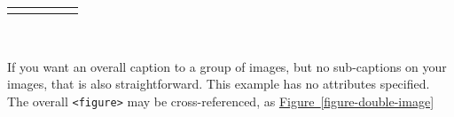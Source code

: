 \documentclass[10pt,]{article}
\theoremstyle{plain}
\theoremstyle{definition}
\theoremstyle{definition}
\theoremstyle{definition}
\theoremstyle{definition}
\theoremstyle{definition}
\theoremstyle{definition}
\numberwithin{equation}{section}
\newlength{\panelmax}
\begin{document}
{\setlength{\phEimage}{\ht\panelboxEimage+\dp\panelboxEimage}
\settototalheight{\phEimage}{\usebox{\panelboxEimage}}
\setlength{\panelmax}{\maxof{\panelmax}{\phEimage}}
\leavevmode%
\setlength{\tabcolsep}{0\linewidth}
\par\medskip\noindent
\begin{tabular}{@{}*{5}{c}@{}}
\begin{minipage}[c][\panelmax][t]{0.1\linewidth}\usebox{\panelboxAimage}\end{minipage}&
\begin{minipage}[c][\panelmax][c]{0.3\linewidth}\usebox{\panelboxBimage}\end{minipage}&
\begin{minipage}[c][\panelmax][b]{0.2\linewidth}\usebox{\panelboxCimage}\end{minipage}&
\begin{minipage}[c][\panelmax][t]{0.2\linewidth}\usebox{\panelboxDimage}\end{minipage}&
\begin{minipage}[c][\panelmax][c]{0.2\linewidth}\usebox{\panelboxEimage}\end{minipage}\end{tabular}\\
}%
\par
\hypertarget{p-656}{}%
If you want an overall caption to a group of images, but no sub-captions on your images, that is also straightforward.  This example has no attributes specified.  The overall \lstinline?<figure>? may be cross-referenced, as \hyperref[figure-double-image]{Figure~\ref{figure-double-image}}%
\end{document}
